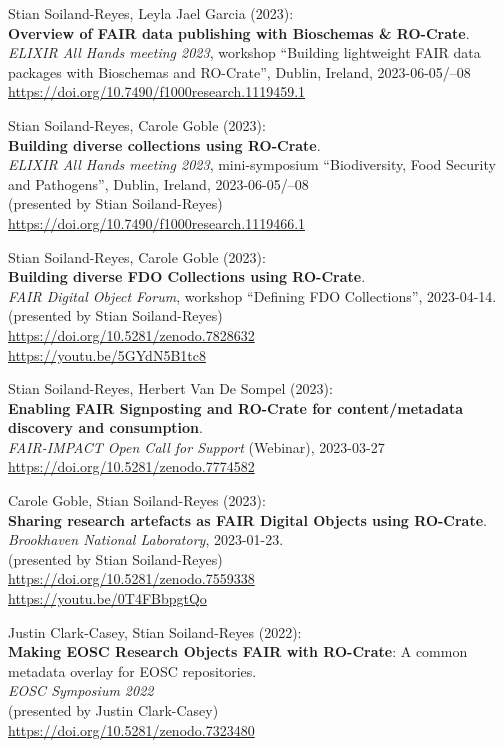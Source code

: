 Stian Soiland-Reyes, Leyla Jael Garcia (2023):\\
\textbf{Overview of FAIR data publishing with Bioschemas \& RO-Crate}.\\
\emph{ELIXIR All Hands meeting 2023}, workshop ``Building lightweight
FAIR data packages with Bioschemas and RO-Crate'', Dublin, Ireland,
2023-06-05/--08\\
\url{https://doi.org/10.7490/f1000research.1119459.1}

Stian Soiland-Reyes, Carole Goble (2023):\\
\textbf{Building diverse collections using RO-Crate}.\\
\emph{ELIXIR All Hands meeting 2023}, mini-symposium ``Biodiversity,
Food Security and Pathogens'', Dublin, Ireland, 2023-06-05/--08\\
(presented by Stian Soiland-Reyes)\\
\url{https://doi.org/10.7490/f1000research.1119466.1}

Stian Soiland-Reyes, Carole Goble (2023):\\
\textbf{Building diverse FDO Collections using RO-Crate}.\\
\emph{FAIR Digital Object Forum}, workshop
``Defining FDO Collections'', 2023-04-14.\\
(presented by Stian Soiland-Reyes)\\
\url{https://doi.org/10.5281/zenodo.7828632}\\
\url{https://youtu.be/5GYdN5B1tc8}

Stian Soiland-Reyes, Herbert Van De Sompel (2023):\\
\textbf{Enabling FAIR Signposting and RO-Crate for content/metadata discovery and consumption}.\\
\emph{FAIR-IMPACT Open Call for Support} (Webinar), 2023-03-27 \\
\url{https://doi.org/10.5281/zenodo.7774582}


Carole Goble, Stian Soiland-Reyes (2023):\\
\textbf{Sharing research artefacts as FAIR Digital Objects using RO-Crate}.\\
\emph{Brookhaven National Laboratory}, 2023-01-23.\\
(presented by Stian Soiland-Reyes)\\
\url{https://doi.org/10.5281/zenodo.7559338} \\
\url{https://youtu.be/0T4FBbpgtQo}

Justin Clark-Casey, Stian Soiland-Reyes (2022):\\
\textbf{Making EOSC Research Objects FAIR with RO-Crate}: A common metadata overlay for EOSC repositories.\\
\emph{{EOSC Symposium 2022}}\\
(presented by Justin Clark-Casey)\\
\url{https://doi.org/10.5281/zenodo.7323480}

